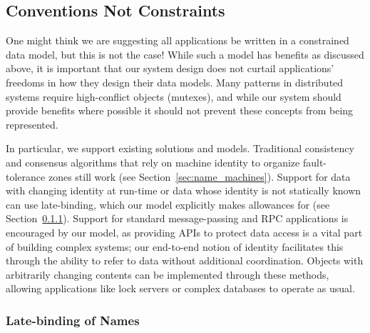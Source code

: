    \subsection{Conventions Not Constraints}

    One might think we are suggesting all applications be written in a constrained data
    model, but this is not the case! While such a model has benefits as discussed above, it is
    important that our system design does not curtail applications' freedoms in how they design their
    data models. Many patterns in distributed systems require high-conflict objects (\eg mutexes), and
    while our system should provide benefits where possible it should not prevent these concepts from
    being represented.

    In particular, we support existing solutions and models. Traditional consistency and
    consensus algorithms that rely on machine identity to organize fault-tolerance zones still work (see
    Section~\ref{sec:name_machines}). Support for data with changing identity at run-time or data whose
    identity is not statically known can use late-binding, which our model explicitly makes
    allowances for (see Section~\ref{sec:latebinding}). Support for standard message-passing and RPC
    applications is encouraged by our model, as providing APIs to protect data access is a vital part of
    building complex systems; our end-to-end notion of identity facilitates this through the ability to
    refer to data without additional coordination. Objects with arbitrarily changing contents can be
    implemented through these methods, allowing applications like lock servers or complex databases to
    operate as usual.



    \subsubsection{Late-binding of Names}
    \label{sec:latebinding}

